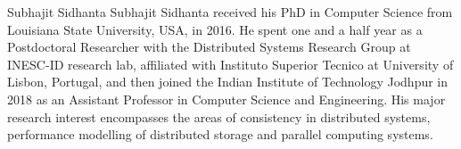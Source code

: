 \documentclass[conference]{IEEEtran}
\begin{document}
%
\begin{IEEEbiography}{Subhajit Sidhanta}
	Subhajit Sidhanta received his PhD in Computer Science from Louisiana State University, USA, in 2016. He spent one and a half year as a Postdoctoral Researcher with the Distributed Systems Research Group at INESC-ID research lab, affiliated with Instituto Superior Tecnico at University of Lisbon, Portugal, and then joined the Indian Institute of Technology Jodhpur in 2018 as an Assistant Professor in Computer Science and Engineering. His major research interest encompasses the areas of consistency in distributed systems, performance modelling of distributed storage and parallel computing systems.
\end{IEEEbiography}
\end{document}
